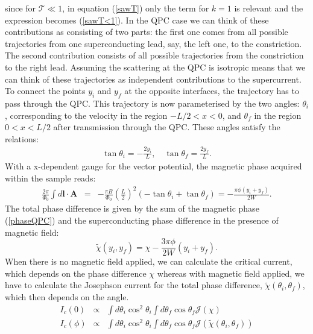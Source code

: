 \documentclass[a4paper]{article}
\begin{document}
since for $\mathcal{T} \ll 1$, in equation (\ref{sawT}) only the term for $k = 1$ is relevant and the expression becomes (\ref{sawT<1}).
In the QPC case we can think of these contributions as consisting of two parts: the first one comes from all possible trajectories from one superconducting lead, say, the left one, to the constriction. The second contribution consists of all possible trajectories from the constriction to the right lead. Assuming the scattering at the QPC is isotropic means that we can think of these trajectories as independent contributions to the supercurrent. To connect the points $y_i$ and $y_f$ at the opposite interfaces, the trajectory has to pass through the QPC.
This trajectory is now parameterised by the two angles: $\theta_i$, corresponding to the velocity in the region $-L/2<x<0$, and $\theta_f$ in the region $0<x<L/2$ after transmission through the QPC.
These angles satisfy the relations:
\begin{eqnarray}
\tan\theta_i=-\frac{2y_i}{L}, \quad \tan\theta_f=\frac{2y_f}{L}.
\end{eqnarray}
With a x-dependent gauge for the vector potential, the magnetic phase acquired within the sample reads:
\begin{eqnarray}
\frac{2\pi}{\Phi_0} \int d\mathbf{l} \cdot \mathbf{A}  &=&
-\frac{\pi B}{\Phi_0}\left(\frac{L}{2}\right)^2
\left(-\tan\theta_i + \tan\theta_f\right) =
-\frac{\pi \phi (y_i+y_f)}{2 W}.
\label{phaseQPC}
\end{eqnarray}
The total phase difference is given by the sum of the magnetic phase (\ref{phaseQPC}) 
and the superconducting phase difference in the presence of magnetic field:
\begin{equation}
\tilde{\chi}(y_i,y_f)=\chi-\frac{3\pi \phi }{2W}(y_i+y_f).
\end{equation}
When there is no magnetic field applied, we can calculate the critical current, which depends on the phase difference $\chi$ whereas with magnetic field applied, we have to calculate the Josephson current for the total phase difference, $\tilde{\chi}\left(\theta_i, \theta_f\right)$, which then depends on the angle.
\begin{eqnarray}
I_c \left(0\right) &\propto& \int d \theta_i \cos^2 \theta_i \int d \theta_f \cos \theta_f \mathcal{J}\left(\chi \right) \\
I_c \left(\phi\right)  &\propto& \int d \theta_i \cos^2 \theta_i \int d \theta_f \cos \theta_f \mathcal{J}\left(\tilde{\chi}\left(\theta_i, \theta_f\right) \right)
\end{eqnarray}
\end{document}
